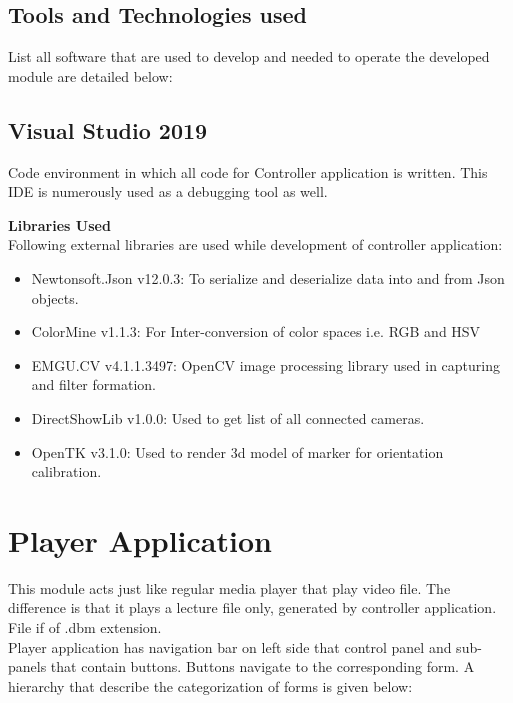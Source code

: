 \subsection{Tools and Technologies used}
List all software that are used to develop and needed to operate the developed module are detailed below:

\subsection{Visual Studio 2019}
Code environment in which all code for Controller application is written. This IDE is numerously used as a debugging tool as well.

\textbf{Libraries Used}\mbox{}\\
Following external libraries are used while development of controller application:

\begin{itemize}

\item Newtonsoft.Json v12.0.3: To serialize and deserialize data into and from Json objects.
\item ColorMine v1.1.3: For Inter-conversion of color spaces i.e. RGB and HSV
\item EMGU.CV v4.1.1.3497: OpenCV image processing library used in capturing and filter formation.
\item DirectShowLib v1.0.0: Used to get list of all connected cameras.
\item OpenTK v3.1.0: Used to render 3d model of marker for orientation calibration.

\end{itemize}

\section{Player Application}
This module acts just like regular media player that play video file. The difference is that it plays a lecture file only, generated by controller application. File if of .dbm extension.\\
Player application has navigation bar on left side that control panel and sub-panels that contain buttons. Buttons navigate to the corresponding form. A hierarchy that describe the categorization of forms is given below:

